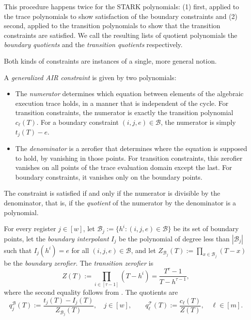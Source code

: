 \documentclass[../../book]{subfiles}
\begin{document}
This procedure happens twice for the STARK polynomials: (1) first, applied to the trace polynomials to show satisfaction of the boundary constraints and (2) second, applied to the transition polynomials to show that the transition constraints are satisfied. We call the resulting lists of quotient polynomials the \emph{boundary quotients} and the \emph{transition quotients} respectively.

Both kinds of constraints are instances of a single, more general notion.

\begin{definition}\label{def:gen-air}
  A \emph{generalized AIR constraint} is given by two polynomials:
  \begin{itemize}
    \item The \emph{numerator} determines which equation between elements of the algebraic execution
    trace holds, in a manner that is independent of the cycle. For transition constraints, the numerator
    is exactly the transition polynomial $c_\ell(T)$. For a boundary constraint $(i,j,e) \in \mathcal{B}$,
    the numerator is simply $t_j(T) - e$.
    \item The \emph{denominator} is a zerofier that determines where the equation is supposed to hold,
    by vanishing in those points. For transition constraints, this zerofier vanishes on all points of the
    trace evaluation domain except the last. For boundary constraints, it vanishes only on the boundary points.
  \end{itemize}
  The constraint is satisfied if and only if the numerator is divisible by the denominator, that is,
  if the \emph{quotient} of the numerator by the denominator is a polynomial.
\end{definition}

For every register $j \in [w]$, let $\mathcal{B}_j := \{h^i : (i,j,e) \in \mathcal{B}\}$ be its set of
boundary points, let the \emph{boundary interpolant} $I_j$ be the polynomial of degree less than
$|\mathcal{B}_j|$ such that $I_j(h^i) = e$ for all $(i,j,e) \in \mathcal{B}$, and let
$Z_{\mathcal{B}_j}(T) := \prod_{x \in \mathcal{B}_j} (T - x)$ be the \emph{boundary zerofier}.
The \emph{transition zerofier} is
\begin{equation*}
  Z(T) := \prod_{i \in [\tau-1]} (T - h^i) = \frac{T^\tau - 1}{T - h^{\tau-1}},
\end{equation*}
where the second equality follows from . The quotients are
\begin{equation*}
  q^{\mathcal{B}}_j(T) := \frac{t_j(T) - I_j(T)}{Z_{\mathcal{B}_j}(T)}, \quad j \in [w],
  \qquad
  q^{\mathcal{T}}_\ell(T) := \frac{c_\ell(T)}{Z(T)}, \quad \ell \in [m].
\end{equation*}
\end{document}
